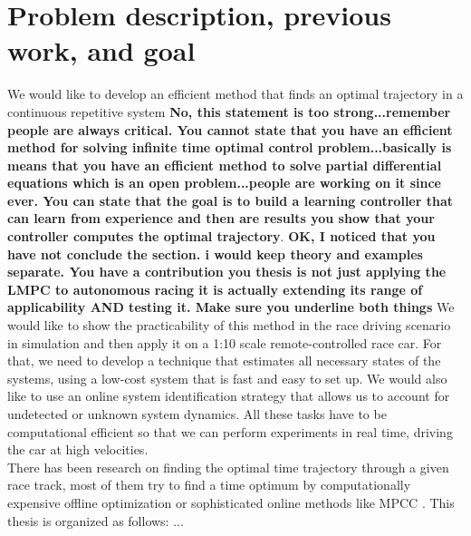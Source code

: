 \section{Problem description, previous work, and goal}
We would like to develop an efficient method that finds an optimal trajectory in a continuous repetitive system {\bfseries{No, this statement is too strong...remember people are always critical. You cannot state that you have an efficient method for solving infinite time optimal control problem...basically is means that you have an efficient method to solve partial differential equations which is an open problem...people are working on it since ever. You can state that the goal is to build a learning controller that can learn from experience and then are results you show that your controller computes the optimal trajectory}}. {\bfseries{OK, I noticed that you have not conclude the section. i would keep theory and examples separate. You have a contribution you thesis is not just applying the LMPC to autonomous racing it is actually extending its range of applicability AND testing it. Make sure you underline both things}} We would like to show the practicability of this method in the race driving scenario in simulation and then apply it on a 1:10 scale remote-controlled race car. For that, we need to develop a technique that estimates all necessary states of the systems, using a low-cost system that is fast and easy to set up. We would also like to use an online system identification strategy that allows us to account for undetected or unknown system dynamics. All these tasks have to be computational efficient so that we can perform experiments in real time, driving the car at high velocities.\\
There has been research on finding the optimal time trajectory through a given race track, most of them try to find a time optimum by computationally expensive offline optimization or sophisticated online methods like MPCC \cite{Liniger2015}.
This thesis is organized as follows: ...
